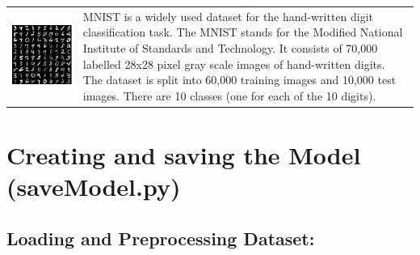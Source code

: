 \documentclass[onecolumn]{article}
\begin{document}
 \begin{tabular}{C{3.8cm}  L{8.8cm}}
        \includegraphics[width=0.9\linewidth]{mnist.png} &  \newline 
        MNIST is a widely used dataset for the hand-written digit classification task. The MNIST stands for the Modified National Institute of Standards and Technology. It consists of 70,000 labelled 28x28 pixel gray scale images of hand-written digits. The dataset is split into 60,000 training images and 10,000 test images. There are 10 classes (one for each of the 10 digits). 
       
    \end{tabular}
\clearpage



\section{Creating and saving the Model (saveModel.py)}
\subsection{Loading and Preprocessing Dataset:}
\end{document}
